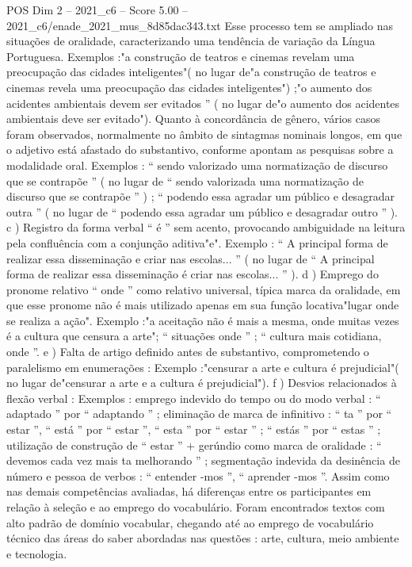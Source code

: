 \begin{textsample}{POS Dim 2 – 2021\_c6 – Score 5.00 – 2021\_c6/enade\_2021\_mus\_8d85dac343.txt}
Esse processo tem se ampliado nas situações de oralidade, caracterizando uma tendência de variação da Língua Portuguesa.
Exemplos :"a construção de teatros e cinemas revelam uma preocupação das cidades inteligentes"( no lugar de"a construção de teatros e cinemas revela uma preocupação das cidades inteligentes") ;"o aumento dos acidentes ambientais devem ser evitados ” ( no lugar de"o aumento dos acidentes ambientais deve ser evitado").
Quanto à concordância de gênero, vários casos foram observados, normalmente no âmbito de sintagmas nominais longos, em que o adjetivo está afastado do substantivo, conforme apontam as pesquisas sobre a modalidade oral.
Exemplos : “ sendo valorizado uma normatização de discurso que se contrapõe ” ( no lugar de “ sendo valorizada uma normatização de discurso que se contrapõe ” ) ; “ podendo essa agradar um público e desagradar outra ” ( no lugar de “ podendo essa agradar um público e desagradar outro ” ). c ) Registro da forma verbal “ é ” sem acento, provocando ambiguidade na leitura pela confluência com a conjunção aditiva"e".
Exemplo : “ A principal forma de realizar essa disseminação e criar nas escolas... ” ( no lugar de “ A principal forma de realizar essa disseminação é criar nas escolas... ” ). d ) Emprego do pronome relativo “ onde ” como relativo universal, típica marca da oralidade, em que esse pronome não é mais utilizado apenas em sua função locativa"lugar onde se realiza a ação".
Exemplo :"a aceitação não é mais a mesma, onde muitas vezes é a cultura que censura a arte"; “ situações onde ” ; “ cultura mais cotidiana, onde ”. e ) Falta de artigo definido antes de substantivo, comprometendo o paralelismo em enumerações : Exemplo :"censurar a arte e cultura é prejudicial"( no lugar de"censurar a arte e a cultura é prejudicial"). f ) Desvios relacionados à flexão verbal : Exemplos : emprego indevido do tempo ou do modo verbal : “ adaptado ” por “ adaptando ” ; eliminação de marca de infinitivo : “ ta ” por “ estar ”, “ está ” por “ estar ”, “ esta ” por “ estar ” ; “ estás ” por “ estas ” ; utilização de construção de “ estar ” + gerúndio como marca de oralidade : “ devemos cada vez mais ta melhorando ” ; segmentação indevida da desinência de número e pessoa de verbos : “ entender -mos ”, “ aprender -mos ”.
Assim como nas demais competências avaliadas, há diferenças entre os participantes em relação à seleção e ao emprego do vocabulário.
Foram encontrados textos com alto padrão de domínio vocabular, chegando até ao emprego de vocabulário técnico das áreas do saber abordadas nas questões : arte, cultura, meio ambiente e tecnologia.

\end{textsample}
